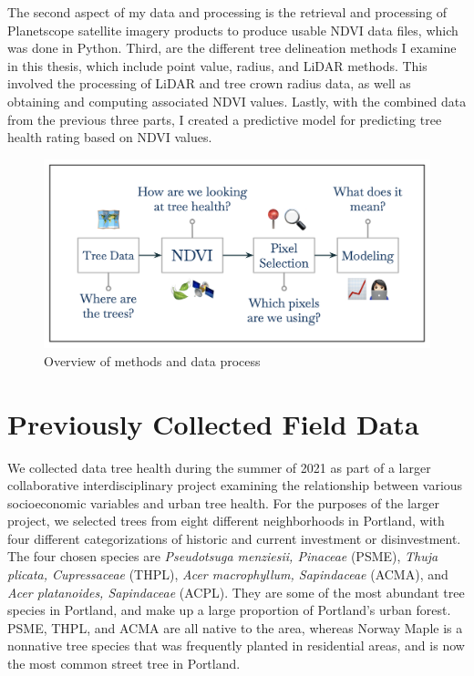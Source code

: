 \documentclass[12pt,twoside]{reedthesis}
\begin{document}
The second aspect of my data and processing is the retrieval and
processing of Planetscope satellite imagery products to produce usable
NDVI data files, which was done in Python. Third, are the different tree
delineation methods I examine in this thesis, which include point value,
radius, and LiDAR methods. This involved the processing of LiDAR and
tree crown radius data, as well as obtaining and computing associated
NDVI values. Lastly, with the combined data from the previous three
parts, I created a predictive model for predicting tree health rating
based on NDVI values.
\begin{figure}

{\centering \includegraphics[width=0.95\linewidth]{figure/methods-overview} 

}

\caption{Overview of methods and data process}\label{fig:methods-overview-fig}
\end{figure}
\hypertarget{previously-collected-field-data}{%
\section{Previously Collected Field Data}\label{previously-collected-field-data}}

We collected data tree health during the summer of 2021 as part of a
larger collaborative interdisciplinary project examining the
relationship between various socioeconomic variables and urban tree
health. For the purposes of the larger project, we selected trees from
eight different neighborhoods in Portland, with four different
categorizations of historic and current investment or disinvestment. The
four chosen species are \emph{Pseudotsuga menziesii, Pinaceae} (PSME), \emph{Thuja
plicata, Cupressaceae} (THPL), \emph{Acer macrophyllum, Sapindaceae} (ACMA),
and \emph{Acer platanoides, Sapindaceae} (ACPL). They are some of the most
abundant tree species in Portland, and make up a large proportion of
Portland's urban forest. PSME, THPL, and ACMA are all native to the
area, whereas Norway Maple is a nonnative tree species that was
frequently planted in residential areas, and is now the most common
street tree in Portland.
\end{document}

